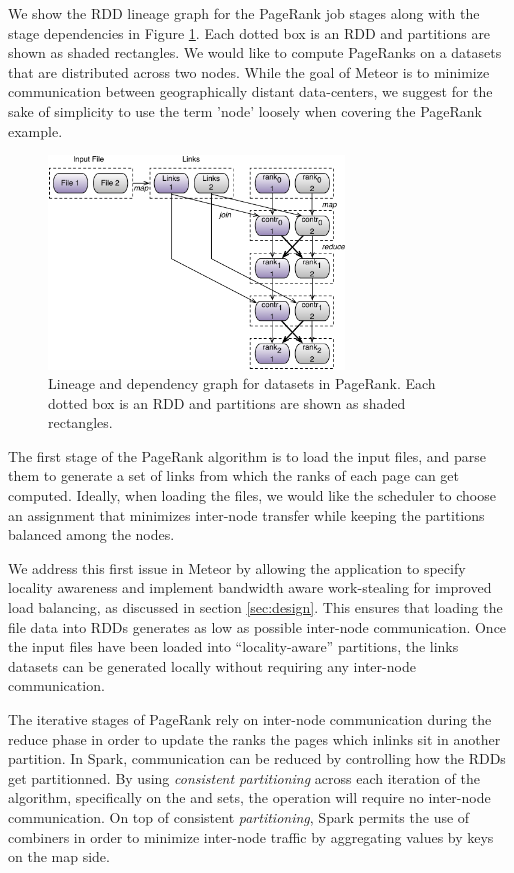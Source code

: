We show the RDD lineage graph for the PageRank job stages along with the stage dependencies in Figure \ref{fig:lineage}. Each dotted box is an RDD and partitions are shown as shaded rectangles. We would like to compute PageRanks on a datasets that are distributed across two nodes. While the goal of Meteor is to minimize communication between geographically distant data-centers, we suggest for the sake of simplicity to use the term 'node' loosely when covering the PageRank example.

\begin{figure}[!ht]
    \centering
    \includegraphics[width=0.7\textwidth]{figs/lineage.pdf}
    \caption{Lineage and dependency graph for datasets in PageRank. Each dotted box is an RDD and partitions are shown as shaded rectangles.}
    \label{fig:lineage}
\end{figure}

The first stage of the PageRank algorithm is to load the input files, and parse them to generate a set of links from which the ranks of each page can get computed. Ideally, when loading the files, we would like the scheduler to choose an assignment that minimizes inter-node transfer while keeping the partitions balanced among the nodes. 

We address this first issue in Meteor by allowing the application to specify locality awareness and implement bandwidth aware work-stealing for improved load balancing, as discussed in section \ref{sec:design}. This ensures that loading the file data into RDDs generates as low as possible inter-node communication. Once the input files have been loaded into ``locality-aware'' partitions, the links datasets can be generated locally without requiring any inter-node communication. 

The iterative stages of PageRank rely on inter-node communication during the reduce phase in order to update the ranks the pages which inlinks sit in another partition. In Spark, communication can be reduced by controlling how the RDDs get partitionned. By using \emph{consistent partitioning} across each iteration of the algorithm, specifically on the  and  sets, the  operation will require no inter-node communication. On top of consistent \emph{partitioning}, Spark permits the use of combiners \cite{hop} in order to minimize inter-node traffic by aggregating values by keys on the map side. 

